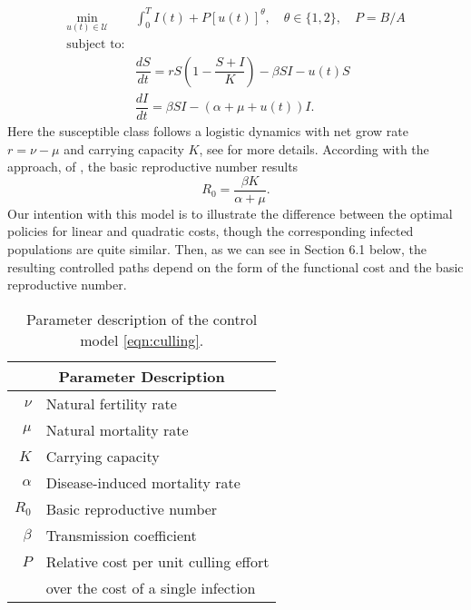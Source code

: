 \begin{equation}\label{eqn:culling}
	\begin{aligned}
  \min_{u(t)\in \mathcal{U}}
    &
    \int_0^T
      I(t) + P [u(t)]^{\theta}, \quad \theta \in \{1,2\},
      \quad P = B/A
  \\ \textrm{subject to:} &
  \\
    &\dfrac{dS}{dt} =
			r S 
			\left (
				1 - \dfrac{S+I}{K}
			\right)
			 - \beta SI - u(t) S
		\\
		&\dfrac{dI}{dt} =
			\beta SI - (\alpha + \mu + u(t)) I.
	\end{aligned}
\end{equation}
%
Here the susceptible class follows a logistic dynamics with net grow rate
$r = \nu - \mu$ and carrying capacity $K$, see 
for more details. According with the approach, 
of \citet{VandenDriessche2017}, the basic reproductive number results
$$
  R_0 = \frac{\beta K}{\alpha + \mu}.
$$ 
  Our intention with this model is to illustrate the difference between the optimal policies for linear and quadratic costs, though the corresponding infected populations are quite similar. Then, as we can see in Section 6.1 below, the resulting controlled paths depend on the form of the functional cost and the basic reproductive 
number.%
\begin{table}
  \begin{center}
    \begin{tabular}{@{}rl@{}}
        \toprule
      \multicolumn{2}{c}{\bf{Parameter Description}}
      \\
      \midrule
      $\nu$
        &
          Natural fertility rate
      \\
      $\mu$
        & Natural mortality rate
      \\
      $K$
        & Carrying capacity
      \\
      $\alpha$
        & Disease-induced mortality rate
      \\
      $R_0$
        & Basic reproductive number
      \\
      $\beta$
        & Transmission coefficient
      \\
      $P$
        & Relative cost per unit culling effort \\
        & over the cost of a single infection
      \\
      \bottomrule
    \end{tabular}
  \end{center}
  \caption{Parameter description of the control model \eqref{eqn:culling}.}
  \label{tbl:culling_parameter_des}
\end{table}